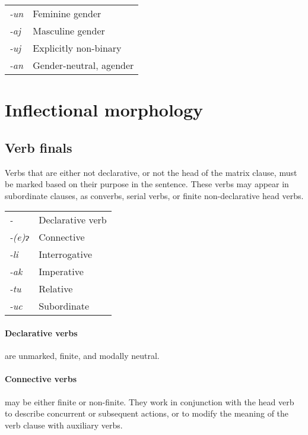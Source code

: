 \documentclass[a4paper,10pt,twoside,openright]{memoir}
\newcommand{\lilglot}{ɂ}
\newcommand{\nm}{\symbol{"2205}}
\begin{document}
\begin{table}[ht]
    \centering
    \begin{tabular}{>{\em}ll}
    -un & Feminine gender \\
    -aj & Masculine gender \\
    -uj & Explicitly non-binary \\
    -an & Gender-neutral, agender \\
    \end{tabular}
\end{table}

\section{Inflectional morphology}

\subsection{Verb finals}

Verbs that are either not declarative, or not the head of the matrix clause, must be marked based on their purpose in the sentence. These verbs may appear in subordinate clauses, as converbs, serial verbs, or finite non-declarative head verbs.

\begin{table}[ht]
    \centering
    \begin{tabular}{>{\em}ll}
        -\nm        & Declarative verb \\
        -(e)\lilglot   & Connective \\
        -li         & Interrogative \\
        -ak         & Imperative \\
        -tu         & Relative \\
        -uc         & Subordinate \\
    \end{tabular}
\end{table}

\paragraph{Declarative verbs} are unmarked, finite, and modally neutral.

\paragraph{Connective verbs} may be either finite or non-finite. They work in conjunction with the head verb to describe concurrent or subsequent actions, or to modify the meaning of the verb clause with auxiliary verbs.
\end{document}
